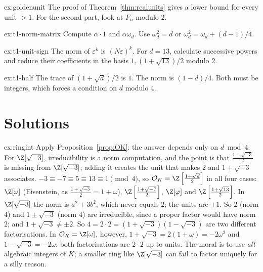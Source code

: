 \begin{hint}{ex:goldenunit}
The proof of Theorem~\ref{thm:realunits} gives a lower bound for every unit $>1$. For the second part, look at $F_n$ modulo $2$.
\end{hint}

\begin{hint}{ex:t1-norm-matrix}
Compute $\alpha\cdot1$ and $\alpha\omega_d$. Use
$\omega_d^2=d$ or $\omega_d^2=\omega_d+(d-1)/4$.
\end{hint}

\begin{hint}{ex:t1-unit-sign}
The norm of $\varepsilon^k$ is $(N\varepsilon)^k$.
For $d=13$, calculate successive powers and reduce their coefficients
in the basis $1,(1+\sqrt{13})/2$ modulo $2$.
\end{hint}

\begin{hint}{ex:t1-half}
The trace of $(1+\sqrt d)/2$ is $1$. The norm is $(1-d)/4$. Both must be integers, which forces a condition on $d$ modulo $4$.
\end{hint}

\section{Solutions}

\begin{solution}{ex:ringint}
\idea Apply Proposition~\ref{prop:OK}: the answer depends only on $d\bmod4$. For $\Z[\sqrt{-3}]$, irreducibility is a norm computation, and the point is that $\frac{1+\sqrt{-3}}2$ is missing from $\Z[\sqrt{-3}]$; adding it creates the unit that makes $2$ and $1+\sqrt{-3}$ associates.
\writeup $-3\equiv-7\equiv5\equiv13\equiv1\pmod4$, so $\mathcal O_K=\Z\left[\frac{1+\sqrt d}2\right]$ in all four cases: $\Z[\omega]$ (Eisenstein, as $\frac{1+\sqrt{-3}}2=1+\omega$), $\Z\left[\frac{1+\sqrt{-7}}2\right]$, $\Z[\varphi]$ and $\Z\left[\frac{1+\sqrt{13}}2\right]$. In $\Z[\sqrt{-3}]$ the norm is $a^2+3b^2$, which never equals $2$; the units are $\pm1$. So $2$ (norm $4$) and $1\pm\sqrt{-3}$ (norm $4$) are irreducible, since a proper factor would have norm $2$; and $1+\sqrt{-3}\ne\pm2$. So $4=2\cdot2=(1+\sqrt{-3})(1-\sqrt{-3})$ are two different factorisations. In $\mathcal O_K=\Z[\omega]$, however, $1+\sqrt{-3}=2(1+\omega)=-2\omega^2$ and $1-\sqrt{-3}=-2\omega$: both factorisations are $2\cdot2$ up to units. The moral is to use \emph{all} algebraic integers of $K$; a smaller ring like $\Z[\sqrt{-3}]$ can fail to factor uniquely for a silly reason.
\end{solution}

